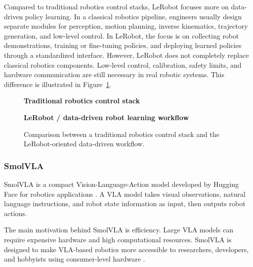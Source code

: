 \documentclass[11pt,a4paper]{article}
\begin{document}
Compared to traditional robotics control stacks, LeRobot focuses more on data-driven policy learning. In a classical robotics pipeline, engineers usually design separate modules for perception, motion planning, inverse kinematics, trajectory generation, and low-level control. In LeRobot, the focus is on collecting robot demonstrations, training or fine-tuning policies, and deploying learned policies through a standardized interface. However, LeRobot does not completely replace classical robotics components. Low-level control, calibration, safety limits, and hardware communication are still necessary in real robotic systems. This difference is illustrated in Figure~\ref{fig:lerobot-vs-traditional}.

\begin{figure}[H]
\centering
\small

\textbf{Traditional robotics control stack}
\vspace{0.2cm}


\vspace{0.5cm}

\textbf{LeRobot / data-driven robot learning workflow}
\vspace{0.2cm}


\caption{Comparison between a traditional robotics control stack and the LeRobot-oriented data-driven workflow.}
\label{fig:lerobot-vs-traditional}
\end{figure}

\subsubsection{SmolVLA}

SmolVLA is a compact Vision-Language-Action model developed by Hugging Face for robotics applications \cite{smolvla_docs}. A VLA model takes visual observations, natural language instructions, and robot state information as input, then outputs robot actions.

The main motivation behind SmolVLA is efficiency. Large VLA models can require expensive hardware and high computational resources. SmolVLA is designed to make VLA-based robotics more accessible to researchers, developers, and hobbyists using consumer-level hardware \cite{smolvla_blog}.
\end{document}
